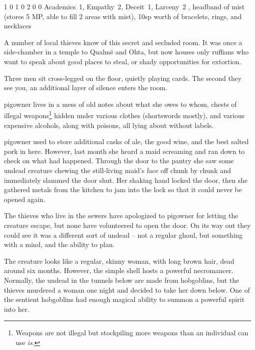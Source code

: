 \begin{multicols}{2}
	{1}%
	{0}%
	{{1}%
	{0}%
	{2}}%
	{0}%
	{0}%
	{Academics~1, Empathy~2, Deceit~1, Larceny~2
	}%
{\Dagger, headband of mist (stores 5 MP, able to fill 2 areas with mist), 10sp worth of bracelets, rings, and necklaces}%
{}


A number of local thieves know of this secret and secluded room.  It was once a side-chamber in a temple to Qualm\"{e} and Ohta, but now houses only ruffians who want to speak about good places to steal, or shady opportunities for extortion.

\begin{boxtext}
	Three men sit cross-legged on the floor, quietly playing cards.
	The second they see you, an additional layer of silence enters the room.
\end{boxtext}



\Gls{pigowner} lives in a mess of old notes about what she owes to whom, chests of illegal weapons\footnote{Weapons are not illegal but stockpiling more weapons than an individual can use \emph{is}.} hidden under various clothes (shortswords mostly), and various expensive alcohols, along with poisons, all lying about without labels.

\label{pig_pantry}

\Gls{pigowner} used to store additional casks of ale, the good wine, and the best salted pork in here.  However, last month she heard a maid screaming and ran down to check on what had happened.  Through the door to the pantry she saw some undead creature chewing the still-living maid's face off chunk by chunk and immediately slammed the door shut.  Her shaking hand locked the door, then she gathered metals from the kitchen to jam into the lock so that it could never be opened again.

The thieves who live in the sewers have apologized to \gls{pigowner} for letting the creature escape, but none have volunteered to open the door.
On its way out they could see it was a different sort of undead -- not a regular ghoul, but something with a mind, and the ability to plan.

The creature looks like a regular, skinny woman, with long brown hair, dead around six months.  However, the simple shell hosts a powerful necromancer.  Normally, the undead in the tunnels below are made from hobgoblins, but the thieves murdered a woman one night and decided to take her down below.  One of the sentient hobgoblins had enough magical ability to summon a powerful spirit into her.


\end{multicols}
